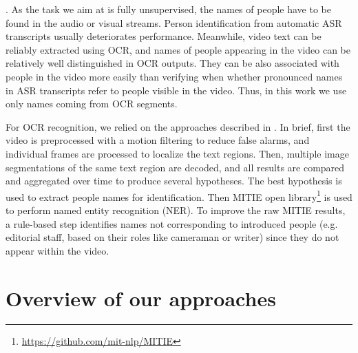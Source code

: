 . As the task we aim at is fully unsupervised, 
the names of people have to be found in the audio  or visual streams.
%
%
Person identification from automatic ASR transcripts usually deteriorates performance. 
Meanwhile, video text can be reliably extracted using OCR, and names of people appearing in the video can be relatively well distinguished in OCR outputs.
They can be also associated with people in the video more easily than 
verifying when whether pronounced names in ASR transcripts refer to people visible in the video. 
Thus, in this work we use only names coming from OCR segments.

For  OCR recognition, we relied on the approaches described in \cite{chen-pr04}.
%
In brief, first the video is preprocessed with a motion filtering to reduce false alarms, 
and individual frames are processed to localize the text regions.
%
%
Then, multiple image segmentations of the same text region are decoded, and all results are compared and 
aggregated over time to produce several hypotheses. 
%
The best hypothesis is used to extract people names for identification. Then MITIE open library\footnote{\url{https://github.com/mit-nlp/MITIE}} is used to perform named entity recognition (NER). 
%
%
To improve the raw MITIE results, a rule-based step identifies names not corresponding to introduced people (e.g. editorial staff,  
based on their roles like  cameraman or writer) since they  do not appear within the video.





\section{Overview of our approaches}
\label{sec:overview}

